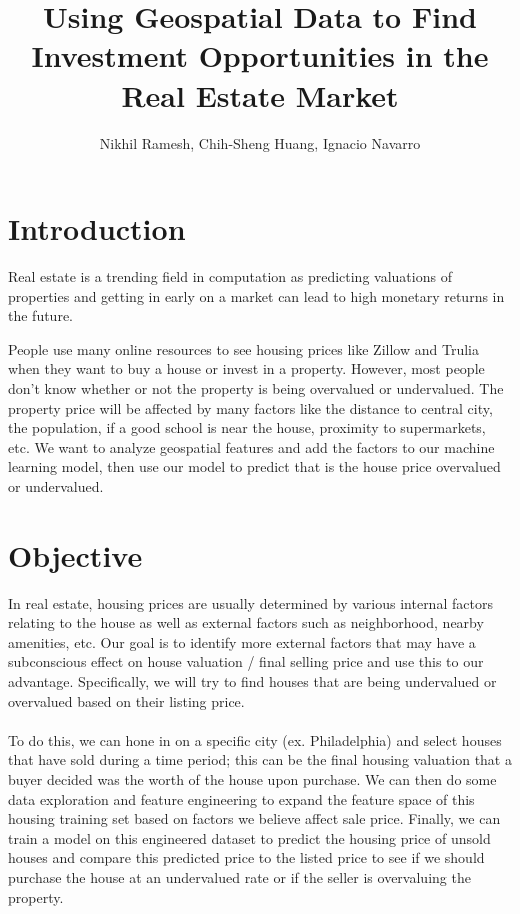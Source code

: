 \documentclass{article}
\title{\vspace{-4cm}Using Geospatial Data to Find Investment Opportunities in the Real Estate Market}
\author{Nikhil Ramesh, Chih-Sheng Huang, Ignacio Navarro}
\begin{document}
\maketitle

\section{Introduction}
Real estate is a trending field in computation as predicting valuations of properties and getting in early on a market can lead to high monetary returns in the future.

People use many online resources to see housing prices like Zillow and Trulia when they want to buy a house or invest in a property. However, most people don't know whether or not the property is being overvalued or undervalued. The property price will be affected by many factors like the distance to central city, the population, if a good school is near the house, proximity to supermarkets, etc. We want to analyze geospatial features and add the factors to our machine learning model, then use our model to predict that is the house price overvalued or undervalued.


\section{Objective}

In real estate, housing prices are usually determined by various internal factors relating to the house as well as external factors such as neighborhood, nearby amenities, etc. Our goal is to identify more external factors that may have a subconscious effect on house valuation / final selling price and use this to our advantage. Specifically, we will try to find houses that are being undervalued or overvalued based on their listing price. \\ \\
To do this, we can hone in on a specific city (ex. Philadelphia) and select houses that have sold during a time period; this can be the final housing valuation that a buyer decided was the worth of the house upon purchase. We can then do some data exploration and feature engineering to expand the feature space of this housing training set based on factors we believe affect sale price. Finally, we can train a model on this engineered dataset to predict the housing price of unsold houses and compare this predicted price to the listed price to see if we should purchase the house at an undervalued rate or if the seller is overvaluing the property.
\end{document}
